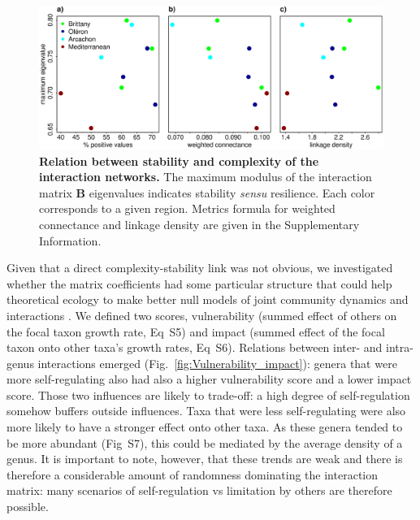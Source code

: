 \documentclass[10pt]{article}
\begin{document}
\begin{figure}[!h]
\centering \includegraphics[width=1\textwidth]{complexity_stability_MainFig_pencenjustB}
\caption{\textbf{Relation between stability and complexity of the interaction
networks.} The maximum modulus of the interaction matrix $\mathbf{B}$
eigenvalues indicates stability \emph{sensu} resilience. Each color corresponds to a given region. Metrics formula for weighted
connectance and linkage density are given in the Supplementary Information.}
\label{fig:Stability-community} 
\end{figure}

Given that a direct complexity-stability link was not obvious, we
investigated whether the matrix coefficients had some particular structure
that could help theoretical ecology to make better null models of
joint community dynamics and interactions \citep{james_constructing_2015}.
We defined two scores, vulnerability (summed effect of others on the
focal taxon growth rate, Eq~S5) and impact (summed effect of the
focal taxon onto other taxa's growth rates, Eq~S6). Relations between
inter- and intra-genus interactions emerged (Fig.~\ref{fig:Vulnerability_impact}):
genera that were more self-regulating also had also a higher vulnerability
score and a lower impact score. Those two influences are likely to
trade-off: a high degree of self-regulation somehow buffers outside
influences. Taxa that were less self-regulating were also more likely
to have a stronger effect onto other taxa. As these genera
tended to be more abundant (Fig~S7), this could be mediated by the average density of a genus. It is important to note, however, that these trends
are weak and there is therefore a considerable amount of randomness
dominating the interaction matrix: many scenarios of self-regulation
vs limitation by others are therefore possible.
\end{document}
